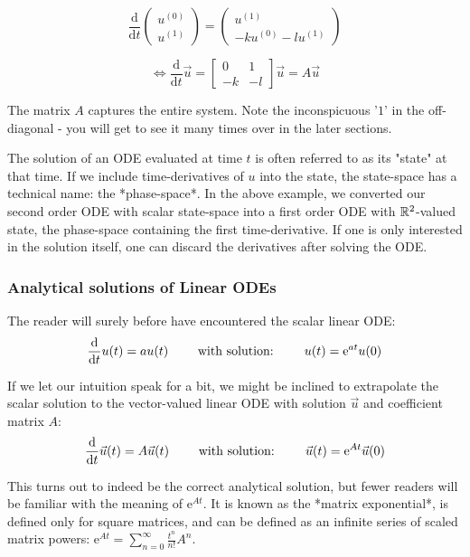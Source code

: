 $$\frac{\text{d}}{\text{d}t}\begin{pmatrix}u^{(0)} \\ u^{(1)}\end{pmatrix} = \begin{pmatrix}u^{(1)} \\ -ku^{(0)} - lu^{(1)}\end{pmatrix}$$

$$ \iff \frac{\text{d}}{\text{d}t}\vec{u} = \begin{bmatrix} 0 & 1 \\ -k & -l \end{bmatrix} \vec{u}=A\vec{u}$$


The matrix $A$ captures the entire system. Note the inconspicuous '$1$' in the off-diagonal - you will get to see it many times over in the later sections.

The solution of an ODE evaluated at time $t$ is often referred to as its "state" at that time. If we include time-derivatives of $u$ into the state, the state-space has a technical name: the *phase-space*. In the above example, we converted our second order ODE with scalar state-space into a first order ODE with $\mathbb{R}^2$-valued state, the phase-space containing the first time-derivative. If one is only interested in the solution itself, one can discard the derivatives after solving the ODE.

\subsubsection*{Analytical solutions of Linear ODEs}
The reader will surely before have encountered the scalar linear ODE:
$$\frac{\text{d}}{\text{d}t}u(t) = au(t) \hspace{20px} \text{ with solution: } \hspace{20px}u(t) = \text{e}^{at}u(0)$$

If we let our intuition speak for a bit, we might be inclined to extrapolate the scalar solution to the vector-valued linear ODE with solution $\vec{u}$ and coefficient matrix $A$:
$$\frac{\text{d}}{\text{d}t}\vec{u}(t) = A\vec{u}(t) \hspace{20px} \text{ with solution: } \hspace{20px}\vec{u}(t) = \text{e}^{At}\vec{u}(0)$$

This turns out to indeed be the correct analytical solution, but fewer readers will be familiar with the meaning of $\text{e}^{At}$. It is known as the *matrix exponential*, is defined only for square matrices, and can be defined as an infinite series of scaled matrix powers: $\text{e}^{At} = \sum_{n=0}^{\infty} \frac{t^n}{n!}A^n$.





